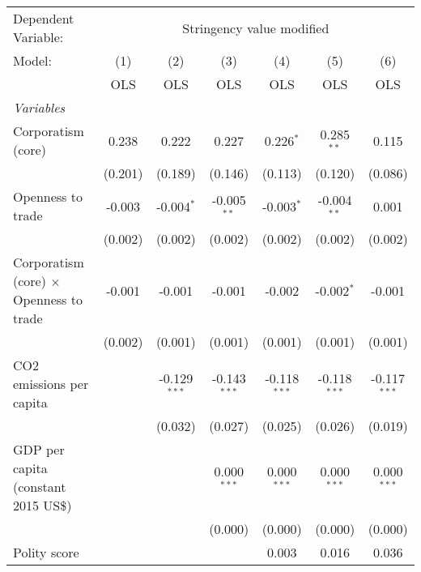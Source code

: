 
\begingroup
\centering
\begin{tabular}{lcccccc}
   \toprule
   Dependent Variable: & \multicolumn{6}{c}{Stringency value modified}\\
   Model:                                         & (1)     & (2)            & (3)            & (4)            & (5)            & (6)\\  
                                                  &  OLS    & OLS            & OLS            & OLS            & OLS            & OLS\\  
   \midrule
   \emph{Variables}\\
   Corporatism (core)                             & 0.238   & 0.222          & 0.227          & 0.226$^{*}$    & 0.285$^{**}$   & 0.115\\   
                                                  & (0.201) & (0.189)        & (0.146)        & (0.113)        & (0.120)        & (0.086)\\   
   Openness to trade                              & -0.003  & -0.004$^{*}$   & -0.005$^{**}$  & -0.003$^{*}$   & -0.004$^{**}$  & 0.001\\   
                                                  & (0.002) & (0.002)        & (0.002)        & (0.002)        & (0.002)        & (0.002)\\   
   Corporatism (core) $\times$ Openness to trade  & -0.001  & -0.001         & -0.001         & -0.002         & -0.002$^{*}$   & -0.001\\   
                                                  & (0.002) & (0.001)        & (0.001)        & (0.001)        & (0.001)        & (0.001)\\   
   CO2 emissions per capita                       &         & -0.129$^{***}$ & -0.143$^{***}$ & -0.118$^{***}$ & -0.118$^{***}$ & -0.117$^{***}$\\   
                                                  &         & (0.032)        & (0.027)        & (0.025)        & (0.026)        & (0.019)\\   
   GDP per capita (constant 2015 US\$)            &         &                & 0.000$^{***}$  & 0.000$^{***}$  & 0.000$^{***}$  & 0.000$^{***}$\\   
                                                  &         &                & (0.000)        & (0.000)        & (0.000)        & (0.000)\\   
   Polity score                                   &         &                &                & 0.003          & 0.016          & 0.036\\   

\end{tabular}

